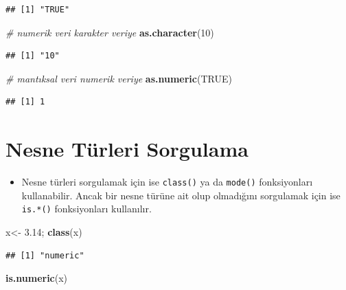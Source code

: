 \documentclass[
  oneside]{book}
\newenvironment{Shaded}{\begin{snugshade}}{\end{snugshade}}
\newcommand{\CommentTok}[1]{\textcolor[rgb]{0.56,0.35,0.01}{\textit{#1}}}
\newcommand{\ConstantTok}[1]{\textcolor[rgb]{0.56,0.35,0.01}{#1}}
\newcommand{\DecValTok}[1]{\textcolor[rgb]{0.00,0.00,0.81}{#1}}
\newcommand{\FloatTok}[1]{\textcolor[rgb]{0.00,0.00,0.81}{#1}}
\newcommand{\FunctionTok}[1]{\textcolor[rgb]{0.13,0.29,0.53}{\textbf{#1}}}
\newcommand{\NormalTok}[1]{#1}
\newcommand{\OtherTok}[1]{\textcolor[rgb]{0.56,0.35,0.01}{#1}}
\providecommand{\tightlist}{%
  \setlength{\itemsep}{0pt}\setlength{\parskip}{0pt}}
\begin{document}
\begin{verbatim}
## [1] "TRUE"
\end{verbatim}

\begin{Shaded}
\begin{Highlighting}[]
\CommentTok{\# numerik veri karakter veriye}
\FunctionTok{as.character}\NormalTok{(}\DecValTok{10}\NormalTok{)}
\end{Highlighting}
\end{Shaded}

\begin{verbatim}
## [1] "10"
\end{verbatim}

\begin{Shaded}
\begin{Highlighting}[]
\CommentTok{\# mantıksal veri numerik veriye}
\FunctionTok{as.numeric}\NormalTok{(}\ConstantTok{TRUE}\NormalTok{)}
\end{Highlighting}
\end{Shaded}

\begin{verbatim}
## [1] 1
\end{verbatim}

\hypertarget{nesne-tuxfcrleri-sorgulama}{%
\section{Nesne Türleri Sorgulama}\label{nesne-tuxfcrleri-sorgulama}}

\begin{itemize}
\tightlist
\item
  Nesne türleri sorgulamak için ise \texttt{class()} ya da \texttt{mode()} fonksiyonları kullanabilir. Ancak bir nesne türüne ait olup olmadığını sorgulamak için ise \texttt{is.*()} fonksiyonları kullanılır.
\end{itemize}

\begin{Shaded}
\begin{Highlighting}[]
\NormalTok{x}\OtherTok{\textless{}{-}} \FloatTok{3.14}\NormalTok{; }\FunctionTok{class}\NormalTok{(x)}
\end{Highlighting}
\end{Shaded}

\begin{verbatim}
## [1] "numeric"
\end{verbatim}

\begin{Shaded}
\begin{Highlighting}[]
\FunctionTok{is.numeric}\NormalTok{(x)}
\end{Highlighting}
\end{Shaded}
\end{document}
